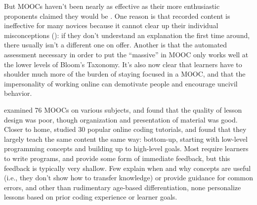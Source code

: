 But MOOCs haven't been nearly as effective as their more enthusiastic
proponents claimed they would be \cite{Ubel2017}.  One reason is that
recorded content is ineffective for many novices because it cannot
clear up their individual misconceptions (): if they
don't understand an explanation the first time around, there usually
isn't a different one on offer.  Another is that the automated
assessment necessary in order to put the ``massive'' in MOOC only
works well at the lower levels of Bloom's Taxonomy.  It's also now
clear that learners have to shoulder much more of the burden of
staying focused in a MOOC, and that the impersonality of working
online can demotivate people and encourage uncivil behavior.

\cite{Marg2015} examined 76 MOOCs on various subjects, and found that
the quality of lesson design was poor, though organization and
presentation of material was good.  Closer to home, \cite{Kim2017}
studied 30 popular online coding tutorials, and found that they
largely teach the same content the same way: bottom-up, starting with
low-level programming concepts and building up to high-level goals.
Most require learners to write programs, and provide some form of
immediate feedback, but this feedback is typically very shallow.  Few
explain when and why concepts are useful (i.e., they don't show how to
transfer knowledge) or provide guidance for common errors, and other
than rudimentary age-based differentiation, none personalize lessons
based on prior coding experience or learner goals.

